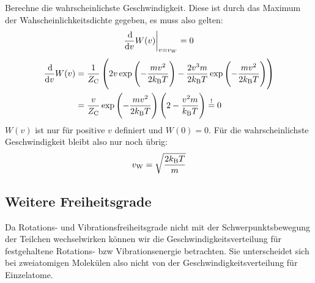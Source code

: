 Berechne die wahrscheinlichste Geschwindigkeit. Diese ist durch das Maximum der Wahscheinlichkeitsdichte gegeben, es muss also gelten:
\[\frac{\dif}{\dif v}W(v)\bigg|_{v=v_W}=0\]
\begin{align*}
\frac{\dif}{\dif v}W(v) &= \frac{1}{Z_\text C}\del{2v\exp\del{-\frac{mv^2}{2k_\text BT}}-\frac{2v^3m}{2k_\text BT}\exp\del{-\frac{mv^2}{2k_\text BT}}} \\
&= \frac{v}{Z_\text C}\exp\del{-\frac{mv^2}{2k_\text BT}} \del{2-\frac{v^2m}{k_\text B T}} \stackrel{!}{=} 0 \\
\end{align*}
$W(v)$ ist nur für positive $v$ definiert und $W(0)=0$. Für die wahrscheinlichste Geschwindigkeit bleibt also nur noch übrig:
\[v_\text W=\sqrt{\frac{2k_\text BT}{m}}\]

\subsection{Weitere Freiheitsgrade}
Da Rotations- und Vibrationsfreiheitsgrade nicht mit der Schwerpunktsbewegung der Teilchen wechselwirken können wir die Geschwindigkeitsverteilung für festgehaltene Rotations- bzw Vibrationsenergie betrachten. Sie unterscheidet sich bei zweiatomigen Molekülen also nicht von der Geschwindigkeitsverteilung für Einzelatome.

\IfFileExists{\bibliographyfile}{
    \printbibliography
}{}



